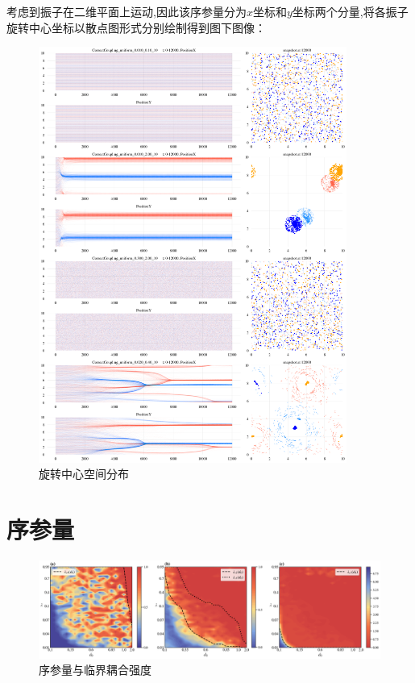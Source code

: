 \documentclass{article}
\begin{document}
考虑到振子在二维平面上运动,因此该序参量分为$x$坐标和$y$坐标两个分量,将各振子旋转中心坐标以散点图形式分别绘制得到图下图像：

\begin{figure}[H]
	\centering
	\includegraphics[width=0.9\textwidth]{./figs/totalXY.png}
	\caption{旋转中心空间分布}
	\label{fig:fig234t.1}
\end{figure}

\newpage
\section{序参量}
\begin{figure}[H]
	\centering
	\includegraphics[width=\textwidth]{./figs/orderParam.png}
	\caption{序参量与临界耦合强度}
\end{figure}
\end{document}
